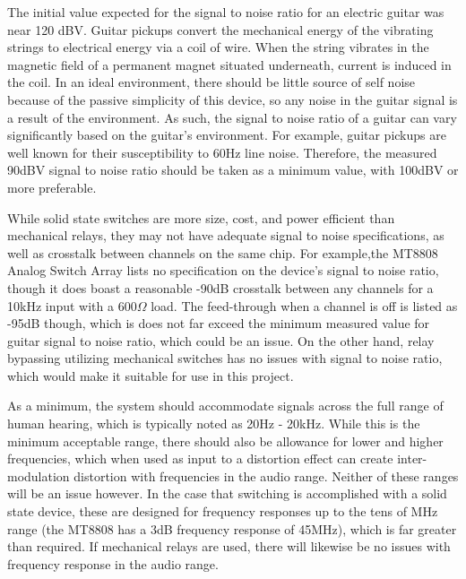 \documentclass{article}
\begin{document}
		\color{gray}
		The initial value expected for the signal to noise ratio for an electric guitar was near 120 dBV.  Guitar pickups convert the mechanical energy of the vibrating strings to electrical energy via a coil of wire.  When the string vibrates in the magnetic field of a permanent magnet situated underneath, current is induced in the coil.  In an ideal environment, there should be little source of self noise because of the passive simplicity of this device, so any noise in the guitar signal is a result of the environment.  As such, the signal to noise ratio of a guitar can vary significantly based on the guitar's environment.  For example, guitar pickups are well known for their susceptibility to 60Hz line noise.  Therefore, the measured 90dBV signal to noise ratio should be taken as a minimum value, with 100dBV or more preferable.

		While solid state switches are more size, cost, and power efficient than mechanical relays, they may not have adequate signal to noise specifications, as well as crosstalk between channels on the same chip.  For example,the MT8808 Analog Switch Array \cite{Zarlink:MT8808} lists no specification on the device's signal to noise ratio, though it does boast a reasonable -90dB crosstalk between any channels for a 10kHz input with a $600 \Omega$ load.  The feed-through when a channel is off is listed as -95dB though, which is does not far exceed the minimum measured value for guitar signal to noise ratio, which could be an issue.  On the other hand, relay bypassing utilizing mechanical switches has no issues with signal to noise ratio, which would make it suitable for use in this project.

		As a minimum, the system should accommodate signals across the full range of human hearing, which is typically noted as 20Hz - 20kHz.  While this is the minimum acceptable range, there should also be allowance for lower and higher frequencies, which when used as input to a distortion effect can create inter-modulation distortion with frequencies in the audio range.  Neither of these ranges will be an issue however.  In the case that switching is accomplished with a solid state device, these are designed for frequency responses up to the tens of MHz range (the MT8808 has a 3dB frequency response of 45MHz), which is far greater than required.  If mechanical relays are used, there will likewise be no issues with frequency response in the audio range.
		
		\color{black}
\end{document}
